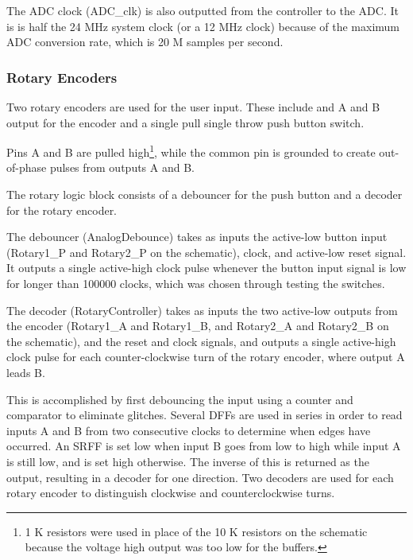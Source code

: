 \documentclass[12pt]{refart} %
\begin{document}
The ADC clock (ADC\_clk) is also outputted from the controller to the ADC. It is is half the 24 MHz system clock (or a 12 MHz clock) because of the maximum ADC conversion rate, which is 20 M samples per second.

\subsubsection{Rotary Encoders} \label{subsec:Rotary}%
Two rotary encoders are used for the user input. %
These include and A and B output for the encoder and a single pull single throw push button switch. 

Pins A and B are pulled high\footnote{1 K resistors were used in place of the 10 K resistors on the schematic because the voltage high output was too low for the buffers.}, while the common pin is grounded to create out-of-phase pulses from outputs A and B. 


The rotary logic block consists of a debouncer for the push button and a decoder for the rotary encoder. %

The debouncer (AnalogDebounce) takes as inputs the active-low button input (Rotary1\_P and Rotary2\_P on the schematic), clock, and active-low reset signal. It outputs a single active-high clock pulse whenever the button input signal is low for longer than 100000 clocks, which was chosen through testing the switches. 

The decoder (RotaryController) takes as inputs the two active-low outputs from the encoder (Rotary1\_A and Rotary1\_B, and Rotary2\_A and Rotary2\_B on the schematic), and the reset and clock signals, and outputs a single active-high clock pulse for each counter-clockwise turn of the rotary encoder, where output A leads B. %

This is accomplished by first debouncing the input using a counter and comparator to eliminate glitches. Several DFFs are used in series in order to read inputs A and B from two consecutive clocks to determine when edges have occurred. An SRFF is set low when input B goes from low to high while input A is still low, and is set high otherwise. The inverse of this is returned as the output, resulting in a decoder for one direction. Two decoders are used for each rotary encoder to distinguish clockwise and counterclockwise turns. 
\end{document}
